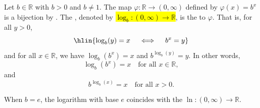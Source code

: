 \begin{definition} \label{definition:logarithm_with_base_b_of_positive_real}
    Let $b \in \mathbb{R}$ with $b > 0$ and $b \neq 1$. The map $\varphi : \mathbb{R} \to (0, \infty)$ defined by $\varphi(x) = b^x$ is a bijection by . The , denoted by \hl{$\log_b : (0, \infty) \to \mathbb{R}$}, is the  to $\varphi$. That is, for all $y > 0$,
    $$\hlin{\log_b(y) = x \quad \iff \quad b^x = y}$$
    and for all $x \in \mathbb{R}$, we have $\log_b(b^x) = x$ and $b^{\log_b(y)} = y$. In other words,
    $$\log_b(b^x) = x \quad \text{for all } x \in \mathbb{R},$$
    and
    $$b^{\log_b(x)} = x \quad \text{for all } x > 0.$$

    When $b = e$, the logarithm with base $e$ coincides with the  $\ln : (0, \infty) \to \mathbb{R}$.
\end{definition}
